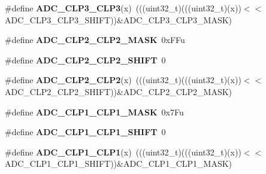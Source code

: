 \begin{DoxyCompactItemize}
\item 
\#define {\bfseries A\+D\+C\+\_\+\+C\+L\+P3\+\_\+\+C\+L\+P3}(x)~(((uint32\+\_\+t)(((uint32\+\_\+t)(x))$<$$<$A\+D\+C\+\_\+\+C\+L\+P3\+\_\+\+C\+L\+P3\+\_\+\+S\+H\+I\+FT))\&A\+D\+C\+\_\+\+C\+L\+P3\+\_\+\+C\+L\+P3\+\_\+\+M\+A\+SK)\hypertarget{group__ADC__Register__Masks_ga3f0884b7fa6046cdcb1cce1eb2511baf}{}\label{group__ADC__Register__Masks_ga3f0884b7fa6046cdcb1cce1eb2511baf}

\item 
\#define {\bfseries A\+D\+C\+\_\+\+C\+L\+P2\+\_\+\+C\+L\+P2\+\_\+\+M\+A\+SK}~0x\+F\+Fu\hypertarget{group__ADC__Register__Masks_ga2d10a369ac0c13f4ee3535e9f45a5d17}{}\label{group__ADC__Register__Masks_ga2d10a369ac0c13f4ee3535e9f45a5d17}

\item 
\#define {\bfseries A\+D\+C\+\_\+\+C\+L\+P2\+\_\+\+C\+L\+P2\+\_\+\+S\+H\+I\+FT}~0\hypertarget{group__ADC__Register__Masks_ga071963a7a6ff4f1b72c79c66aee09043}{}\label{group__ADC__Register__Masks_ga071963a7a6ff4f1b72c79c66aee09043}

\item 
\#define {\bfseries A\+D\+C\+\_\+\+C\+L\+P2\+\_\+\+C\+L\+P2}(x)~(((uint32\+\_\+t)(((uint32\+\_\+t)(x))$<$$<$A\+D\+C\+\_\+\+C\+L\+P2\+\_\+\+C\+L\+P2\+\_\+\+S\+H\+I\+FT))\&A\+D\+C\+\_\+\+C\+L\+P2\+\_\+\+C\+L\+P2\+\_\+\+M\+A\+SK)\hypertarget{group__ADC__Register__Masks_ga9b88c4499b2da56a5919cb15dcdc5dab}{}\label{group__ADC__Register__Masks_ga9b88c4499b2da56a5919cb15dcdc5dab}

\item 
\#define {\bfseries A\+D\+C\+\_\+\+C\+L\+P1\+\_\+\+C\+L\+P1\+\_\+\+M\+A\+SK}~0x7\+Fu\hypertarget{group__ADC__Register__Masks_ga597fddbb6d859ea54a49dd4a1eea72fb}{}\label{group__ADC__Register__Masks_ga597fddbb6d859ea54a49dd4a1eea72fb}

\item 
\#define {\bfseries A\+D\+C\+\_\+\+C\+L\+P1\+\_\+\+C\+L\+P1\+\_\+\+S\+H\+I\+FT}~0\hypertarget{group__ADC__Register__Masks_gab34e145666bb569d17f381665d6f5156}{}\label{group__ADC__Register__Masks_gab34e145666bb569d17f381665d6f5156}

\item 
\#define {\bfseries A\+D\+C\+\_\+\+C\+L\+P1\+\_\+\+C\+L\+P1}(x)~(((uint32\+\_\+t)(((uint32\+\_\+t)(x))$<$$<$A\+D\+C\+\_\+\+C\+L\+P1\+\_\+\+C\+L\+P1\+\_\+\+S\+H\+I\+FT))\&A\+D\+C\+\_\+\+C\+L\+P1\+\_\+\+C\+L\+P1\+\_\+\+M\+A\+SK)\hypertarget{group__ADC__Register__Masks_gaf48a7a2edeb5d0485c5cdfdf19bd3e18}{}\label{group__ADC__Register__Masks_gaf48a7a2edeb5d0485c5cdfdf19bd3e18}


\end{DoxyCompactItemize}
